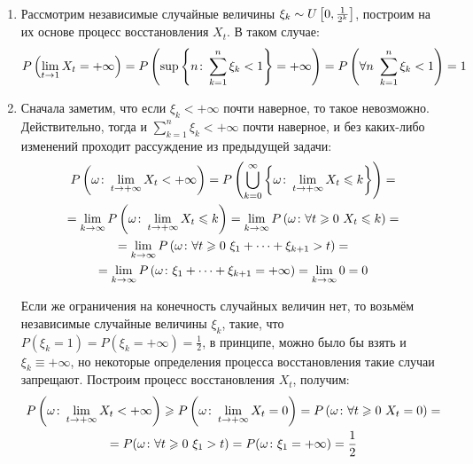 \begin{solution}~
    \begin{enumerate}
        \item Рассмотрим независимые случайные величины $\xi_k \sim U\left[0, \frac{1}{2^k}\right]$, построим на их основе процесс восстановления $X_t$. В таком случае:
        \[
            P\left(\lim\limits_{t \to 1} X_t = +\infty\right) = P\left(\sup \left\{n \colon \sum_{k=1}^n \xi_k < 1\right\} = +\infty\right) = P\left(\forall n \ \sum_{k=1}^n \xi_k < 1\right) = 1
        \]

        \item Сначала заметим, что если $\xi_k < +\infty$ почти наверное, то такое невозможно. Действительно, тогда и $\sum_{k=1}^n \xi_k < +\infty$ почти наверное, и без каких-либо изменений проходит рассуждение из предыдущей задачи:
        \begin{multline*}
            P\ps{\omega \colon \lim_{t \to +\infty} X_t < +\infty} = P\ps{\bigcup_{k=0}^\infty \set{\omega \colon \lim_{t \to +\infty} X_t \le k}} =
            \\
            = \lim_{k \to \infty} P\ps{\omega \colon \lim_{t \to +\infty} X_t \le k} = \lim_{k \to \infty} P\ps{\omega \colon \forall t \ge 0 \ X_t \le k} =
            \\
            = \lim_{k \to \infty} P\ps{\omega \colon \forall t \ge 0 \ \xi_1 + \dots + \xi_{k+1} > t} =
            \\
            = \lim_{k \to \infty} P\ps{\omega \colon \xi_1 + \dots + \xi_{k+1} = +\infty} = \lim_{k \to \infty} 0 = 0
        \end{multline*}

        Если же ограничения на конечность случайных величин нет, то возьмём независимые случайные величины $\xi_k$, такие, что $P(\xi_k = 1) = P(\xi_k = +\infty) = \frac{1}{2}$, в принципе, можно было бы взять и $\xi_k \equiv +\infty$, но некоторые определения процесса восстановления такие случаи запрещают. Построим процесс восстановления $X_t$, получим:
        \begin{multline*}
            P\left(\omega \colon \lim_{t \to +\infty} X_t < +\infty\right) \geqslant P\left(\omega \colon \lim_{t \to +\infty} X_t = 0\right) = P\left(\omega \colon \forall t \geqslant 0 \ X_t = 0\right) =
            \\
            = P(\omega \colon \forall t \geqslant 0 \ \xi_1 > t) = P(\omega \colon \xi_1 = +\infty) = \frac{1}{2}
        \end{multline*}
    \end{enumerate}
\end{solution}

